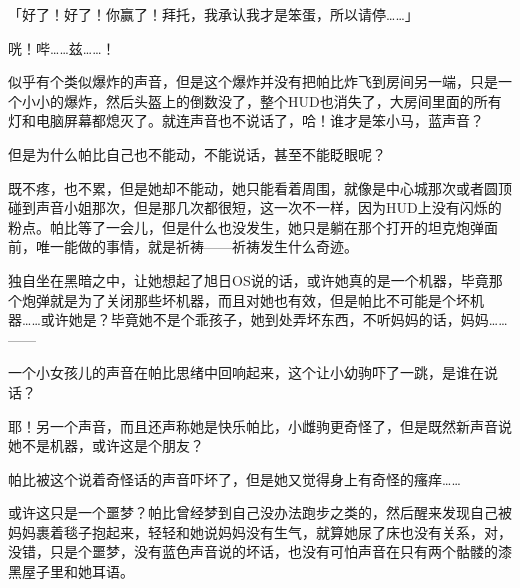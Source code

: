 「好了！好了！你赢了！拜托，我承认我才是笨蛋，所以请停……」

咣！哔……兹……！

似乎有个类似爆炸的声音，但是这个爆炸并没有把帕比炸飞到房间另一端，只是一个小小的爆炸，然后头盔上的倒数没了，整个HUD也消失了，大房间里面的所有灯和电脑屏幕都熄灭了。就连声音也不说话了，哈！谁才是笨小马，蓝声音？

但是为什么帕比自己也不能动，不能说话，甚至不能眨眼呢？

既不疼，也不累，但是她却不能动，她只能看着周围，就像是中心城那次或者圆顶碰到声音小姐那次，但是那几次都很短，这一次不一样，因为HUD上没有闪烁的粉点。帕比等了一会儿，但是什么也没发生，她只是躺在那个打开的坦克炮弹面前，唯一能做的事情，就是祈祷——祈祷发生什么奇迹。

独自坐在黑暗之中，让她想起了旭日OS说的话，或许她真的是一个机器，毕竟那个炮弹就是为了关闭那些坏机器，而且对她也有效，但是帕比不可能是个坏机器……或许她是？毕竟她不是个乖孩子，她到处弄坏东西，不听妈妈的话，妈妈……——



一个小女孩儿的声音在帕比思绪中回响起来，这个让小幼驹吓了一跳，是谁在说话？


耶！另一个声音，而且还声称她是快乐帕比，小雌驹更奇怪了，但是既然新声音说她不是机器，或许这是个朋友？


帕比被这个说着奇怪话的声音吓坏了，但是她又觉得身上有奇怪的瘙痒……{}


或许这只是一个噩梦？帕比曾经梦到自己没办法跑步之类的，然后醒来发现自己被妈妈裹着毯子抱起来，轻轻和她说妈妈没有生气，就算她尿了床也没有关系，对，没错，只是个噩梦，没有蓝色声音说的坏话，也没有可怕声音在只有两个骷髅的漆黑屋子里和她耳语。


